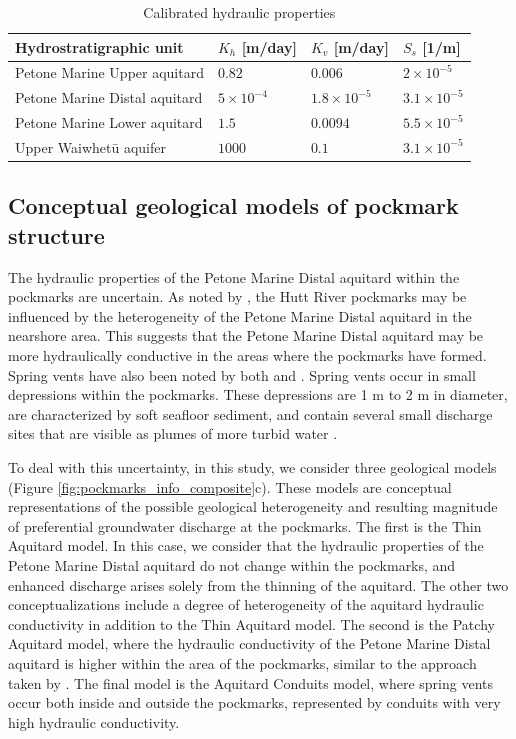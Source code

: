 \documentclass[draft, 10pt]{agujournal2019}
\begin{document}
\begin{table}[h!]
\centering
\caption{Calibrated hydraulic properties \protect\cite{bennett_hutt_2024}}
\begin{tabular}{llll}
\hline
Hydrostratigraphic unit & $K_h$ [m/day] & $K_v$ [m/day] & $S_s$ [1/m]  \\
\hline
Petone Marine Upper aquitard & $0.82$& $0.006$  & $2\times 10^{-5}$ \\
Petone Marine Distal aquitard & $5 \times 10^{-4}$& $1.8 \times 10^{-5}$& $3.1\times 10^{-5}$ \\
Petone Marine Lower aquitard & $1.5$& $0.0094$& $5.5\times 10^{-5}$ \\
Upper Waiwhetū aquifer  & $1000$& $0.1$& $3.1\times 10^{-5}$ \\
\hline
\end{tabular}
\label{tab:welly_parameters}
\end{table}

\subsection{Conceptual geological models of pockmark structure}

The hydraulic properties of the Petone Marine Distal aquitard within the pockmarks are uncertain.
As noted by , the Hutt River pockmarks may be influenced by the heterogeneity of the Petone Marine Distal aquitard in the nearshore area.
This suggests that the Petone Marine Distal aquitard may be more hydraulically conductive in the areas where the pockmarks have formed.
Spring vents have also been noted by both  and .
Spring vents occur in small depressions within the pockmarks.
These depressions are 1 m to 2 m in diameter, are characterized by soft seafloor sediment,
and contain several small discharge sites that are visible as plumes of more turbid water \cite{hoffmann_fresh_2023, harding_characteristics_2000}.

To deal with this uncertainty, in this study, we consider three geological models (Figure \ref{fig:pockmarks_info_composite}c).
These models are conceptual representations of the possible geological heterogeneity and resulting magnitude of preferential groundwater discharge at the pockmarks.
The first is the Thin Aquitard model. In this case, we consider that the hydraulic properties of the Petone Marine Distal aquitard do not change within the pockmarks,
and enhanced discharge arises solely from the thinning of the aquitard.
The other two conceptualizations include a degree of heterogeneity of the aquitard hydraulic conductivity in addition to the Thin Aquitard model.
The second is the Patchy Aquitard model, where the hydraulic conductivity of the Petone Marine Distal aquitard is higher within the area of the pockmarks,
similar to the approach taken by .
The final model is the Aquitard Conduits model, where spring vents occur both inside and outside the pockmarks, represented by conduits with very high hydraulic conductivity.
\end{document}
